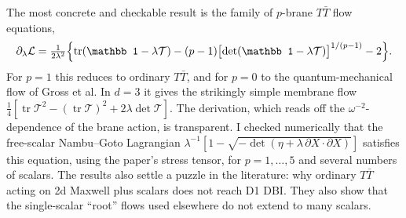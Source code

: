 \documentclass[11pt,a4paper]{article}
\begin{document}
The most concrete and checkable result is the family of $p$-brane $T\bar T$ flow equations,
\[
\partial_\lambda\mathcal L=\tfrac{1}{2\lambda^2}\Bigl\{\operatorname{tr}(\mathbb 1-\lambda\mathcal T)
-(p-1)\bigl[\det(\mathbb 1-\lambda\mathcal T)\bigr]^{1/(p-1)}-2\Bigr\}.
\]
For $p=1$ this reduces to ordinary $T\bar T$, and for $p=0$ to the quantum-mechanical flow
of Gross et al. In $d=3$ it gives the strikingly simple membrane flow
$\tfrac14[\operatorname{tr}\mathcal T^2-(\operatorname{tr}\mathcal T)^2+2\lambda\det\mathcal T]$.
The derivation, which reads off the $\omega^{-2}$-dependence of the brane action, is
transparent. I checked numerically that the free-scalar Nambu--Goto Lagrangian
$\lambda^{-1}[1-\sqrt{-\det(\eta+\lambda\,\partial X\!\cdot\!\partial X)}]$ satisfies this
equation, using the paper's stress tensor, for $p=1,\dots,5$ and several numbers of scalars.
The results also settle a puzzle in the literature: why ordinary $T\bar T$ acting on 2d Maxwell
plus scalars does not reach D1 DBI. They also show that the single-scalar ``root'' flows used
elsewhere do not extend to many scalars.
\end{document}
